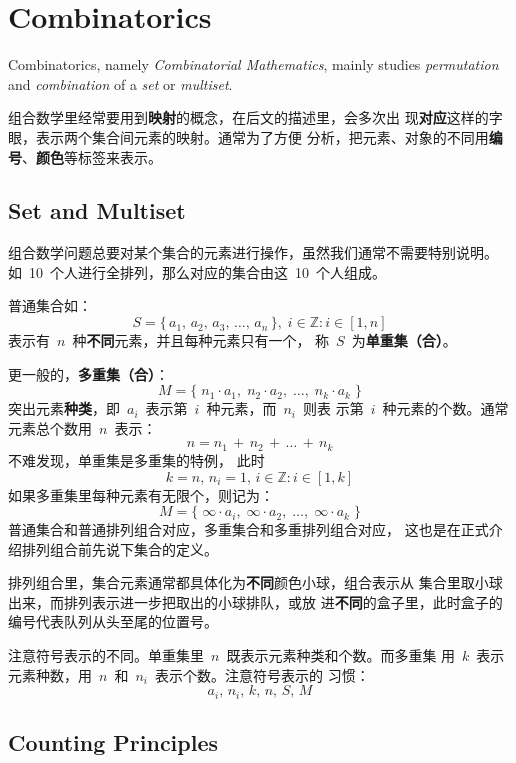 \chapter{Combinatorics}
\label{cha:combinatorics}

Combinatorics, namely \textit{Combinatorial Mathematics}, mainly studies
\textit{permutation} and \textit{combination} of a \textit{set} or \textit{multiset}.

组合数学里经常要用到\textbf{映射}的概念，在后文的描述里，会多次出
现\textbf{对应}这样的字眼，表示两个集合间元素的映射。通常为了方便
分析，把元素、对象的不同用\textbf{编号}、\textbf{颜色}等标签来表示。

\section{Set and Multiset}
\label{sec:set-multiset}

组合数学问题总要对某个集合的元素进行操作，虽然我们通常不需要特别说明。
如~10~个人进行全排列，那么对应的集合由这~10~个人组成。

普通集合如：
\[ S = \{\, a_1,\, a_2,\, a_3,\, \dots,\, a_n\, \},\; i \in
  \mathbb{Z}: i \in [1, n] \]
表示有~$n$~种\textbf{不同}元素，并且每种元素只有一个，
称~$S$~为\textbf{单重集（合）}。

更一般的，\textbf{多重集（合）}：
\[ M = \{\; n_1 \cdot a_1,\; n_2 \cdot a_2,\; \dots,\; n_k \cdot a_k\; \} \]
突出元素\textbf{种类}，即~$a_i$~表示第~$i$~种元素，而~$n_i$~则表
示第~$i$~种元素的个数。通常元素总个数用~$n$~表示：
\[ n = n_1\, +\, n_2\, +\, \dots\, +\, n_k \]
不难发现，单重集是多重集的特例，
此时
\[ k = n,\, n_i = 1,\, i \in \mathbb{Z}: i \in [1,k] \]
如果多重集里每种元素有无限个，则记为：
\[ M = \{\; \infty \cdot a_i,\; \infty \cdot a_2,\; \dots,\; \infty \cdot a_k\; \} \]
普通集合和普通排列组合对应，多重集合和多重排列组合对应，
这也是在正式介绍排列组合前先说下集合的定义。

排列组合里，集合元素通常都具体化为\textbf{不同}颜色小球，组合表示从
集合里取小球出来，而排列表示进一步把取出的小球排队，或放
进\textbf{不同}的盒子里，此时盒子的编号代表队列从头至尾的位置号。

注意符号表示的不同。单重集里~$n$~既表示元素种类和个数。而多重集
用~$k$~表示元素种数，用~$n$~和~$n_i$~表示个数。注意符号表示的
习惯：
\[ a_i,\, n_i,\, k,\, n,\, S,\, M \]

\section{Counting Principles}
\label{sec:counting-principles}

